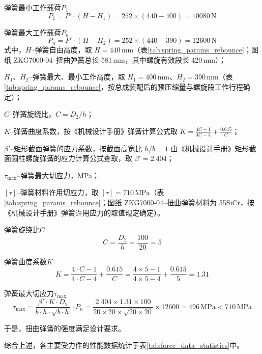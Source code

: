 弹簧最小工作载荷$P_1$
\begin{equation}
    P_1 = P' \cdot (H - H_1) = 252 \times (440 - 400) = 10080 \, \text{N}
\end{equation}

弹簧最大工作载荷$P_n$
\begin{equation}
    P_n = P' \cdot (H - H_2) = 252 \times (440 - 390) = 12600 \, \text{N}
\end{equation}
式中，$H$--弹簧自由高度，取 $H=440\,\text{mm}$（表\ref{tab:spring_params_rebounce}；图纸 ZKG7000-04--扭曲弹簧总长 581\,mm，其中螺旋有效段长 420\,mm）；

$H_1$、$H_2$--弹簧最大、最小工作高度，取 $H_1=400\,\text{mm}$、$H_2=390\,\text{mm}$（表\ref{tab:spring_params_rebounce}，按总成装配后的预压缩量与螺旋段工作行程确定）；

$C$--弹簧旋绕比，$C=D_2/h$；

$K$--弹簧曲度系数，按《机械设计手册》弹簧计算公式\cite{ref26}取 $K = \frac{4C-1}{4C-4} + \frac{0.615}{C}$；

$\beta'$--矩形截面弹簧的应力系数，按截面高宽比 $h/b=1$ 由《机械设计手册》矩形截面圆柱螺旋弹簧的应力计算公式\cite{ref26}查取，取 $\beta'=2.404$；

$\tau_{\max}$--弹簧最大切应力，MPa；

$[\tau]$--弹簧材料许用切应力，取 $[\tau]=710\,\text{MPa}$（表\ref{tab:spring_params_rebounce}；图纸 ZKG7000-04--扭曲弹簧材料为 55SiCr，按《机械设计手册》弹簧许用应力的取值规定确定）。

弹簧旋绕比$C$
\begin{equation}
    C = \frac{D_2}{h} = \frac{100}{20} = 5
\end{equation}

弹簧曲度系数$K$
\begin{equation}
    K = \frac{4 \cdot C - 1}{4 \cdot C - 4} + \frac{0.615}{C} = \frac{4 \times 5 - 1}{4 \times 5 - 4} + \frac{0.615}{5} = 1.31
\end{equation}

弹簧最大切应力$\tau_{\max}$
\begin{equation}
    \tau_{\max} = \frac{\beta' \cdot K \cdot D_2}{b \cdot h \cdot \sqrt{b \cdot h}} \cdot P_n = \frac{2.404 \times 1.31 \times 100}{20 \times 20 \times \sqrt{20 \times 20}} \times 12600 = 496 \, \text{MPa} < 710 \, \text{MPa}
\end{equation}

于是，扭曲弹簧的强度满足设计要求。



综合上述，各主要受力件的性能数据统计于表\ref{tab:force_data_statistics}中。


